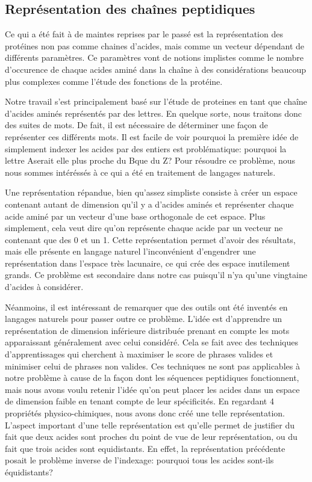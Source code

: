 \documentclass[a4paper,11pt]{article}
\begin{document}
\subsection{Représentation des chaînes peptidiques}

Ce qui a été fait à de maintes reprises par le passé est la représentation des
protéines non pas comme chaines d'acides, mais comme un vecteur dépendant de
différents paramètres. Ce paramètres vont de notions implistes comme le nombre
d'occurence de chaque acides aminé dans la chaîne à des considérations beaucoup
plus complexes comme l'étude des fonctions de la protéine.

Notre travail s'est principalement basé sur l'étude de proteines en tant que
chaîne d'acides aminés représentés par des lettres. En quelque sorte, nous traitons donc des suites de \og
mots\fg. De fait, il est nécessaire de déterminer une façon de représenter ces
différents mots. Il est facile de voir pourquoi la première idée de simplement
indexer les acides par des entiers est problématique: pourquoi la lettre \og
A\fg serait elle plus proche du \og B\fg que du \og Z\fg? Pour résoudre ce
problème, nous nous sommes intéréssés à ce qui a été en traitement de langages
naturels.

Une représentation répandue, bien qu'assez simpliste consiste à créer un espace
contenant autant de dimension qu'il y a d'acides aminés et représenter chaque
acide aminé par un vecteur d'une base orthogonale de cet espace. Plus
simplement, cela veut dire qu'on représente chaque acide par un vecteur ne
contenant que des 0 et un 1. Cette représentation permet d'avoir des résultats,
mais elle présente en langage naturel l'inconvénient d'engendrer une
représentation dans l'espace très lacunaire, ce qui crée des espace inutilement
grands. Ce problème est secondaire dans notre cas puisqu'il n'ya qu'une
vingtaine d'acides à considérer.

Néanmoins, il est intéressant de remarquer que des outils ont été inventés en
langages naturels pour passer outre ce problème. L'idée est d'apprendre un
représentation de dimension inférieure distribuée prenant en compte les mots
apparaissant généralement avec celui considéré. Cela se fait avec des techniques
d'apprentissages qui cherchent à maximiser le score de phrases valides et
minimiser celui de phrases non valides. Ces techniques ne sont pas applicables à
notre problème à cause de la façon dont les séquences peptidiques fonctionnent,
mais nous avons voulu retenir l'idée qu'on peut placer les acides dans un espace
de dimension faible en tenant compte de leur spécificités. En regardant 4
propriétés physico-chimiques, nous avons donc créé une telle représentation.
L'aspect important d'une telle représentation est qu'elle permet de justifier du
fait que deux acides sont proches du point de vue de leur représentation, ou du
fait que trois acides sont equidistants. En effet, la représentation précédente
posait le problème inverse de l'indexage: pourquoi tous les acides sont-ils équidistants?
\end{document}
